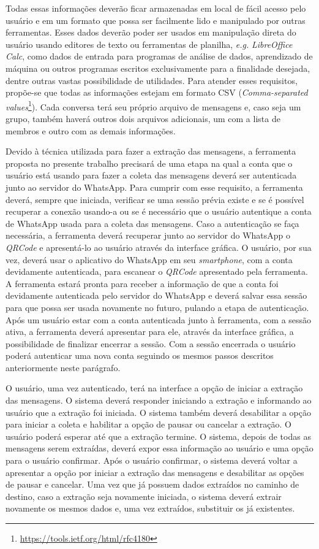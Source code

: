 Todas essas informações deverão ficar armazenadas em local de fácil acesso pelo usuário e em um formato que possa ser facilmente lido e manipulado por outras ferramentas. Esses dados deverão poder ser usados em manipulação direta do usuário usando editores de texto ou ferramentas de planilha, \textit{e.g.} \textit{LibreOffice Calc}, como dados de entrada para programas de análise de dados, aprendizado de máquina ou outros programas escritos exclusivamente para a finalidade desejada, dentre outras vastas possibilidade de utilidades. Para atender esses requisitos, propõe-se que todas as informações estejam em formato CSV (\textit{Comma-separated values}\footnote{\href{https://tools.ietf.org/html/rfc4180}{https://tools.ietf.org/html/rfc4180}}). Cada conversa terá seu próprio arquivo de mensagens e, caso seja um grupo, também haverá outros dois arquivos adicionais, um com a lista de membros e outro com as demais informações.

Devido à técnica utilizada para fazer a extração das mensagens, a ferramenta proposta no presente trabalho precisará de uma etapa na qual a conta que o usuário está usando para fazer a coleta das mensagens deverá ser autenticada junto ao servidor do WhatsApp. Para cumprir com esse requisito, a ferramenta deverá, sempre que iniciada, verificar se uma sessão prévia existe e se é possível recuperar a conexão usando-a ou se é necessário que o usuário autentique a conta de WhatsApp usada para a coleta das mensagens. Caso a autenticação se faça necessária, a ferramenta deverá recuperar junto ao servidor do WhatsApp o \textit{QRCode} e apresentá-lo ao usuário através da interface gráfica. O usuário, por sua vez, deverá usar o aplicativo do WhatsApp em seu \textit{smartphone}, com a conta devidamente autenticada, para escanear o \textit{QRCode} apresentado pela ferramenta. A ferramenta estará pronta para receber a informação de que a conta foi devidamente autenticada pelo servidor do WhatsApp e deverá salvar essa sessão para que possa ser usada novamente no futuro, pulando a etapa de autenticação. Após um usuário estar com a conta autenticada junto à ferramenta, com a sessão ativa, a ferramenta deverá apresentar para ele, através da interface gráfica, a possibilidade de finalizar encerrar a sessão. Com a sessão encerrada o usuário poderá autenticar uma nova conta seguindo os mesmos passos descritos anteriormente neste parágrafo.

O usuário, uma vez autenticado, terá na interface a opção de iniciar a extração das mensagens. O sistema deverá responder iniciando a extração e informando ao usuário que a extração foi iniciada. O sistema também deverá desabilitar a opção para iniciar a coleta e habilitar a opção de pausar ou cancelar a extração. O usuário poderá esperar até que a extração termine. O sistema, depois de todas as mensagens serem extraídas, deverá expor essa informação ao usuário e uma opção para o usuário confirmar. Após o usuário confirmar, o sistema deverá voltar a apresentar a opção por iniciar a extração das mensagens e desabilitar as opções de pausar e cancelar. Uma vez que já possuem dados extraídos no caminho de destino, caso a extração seja novamente iniciada, o sistema deverá extrair novamente os mesmos dados e, uma vez extraídos, substituir os já existentes.

